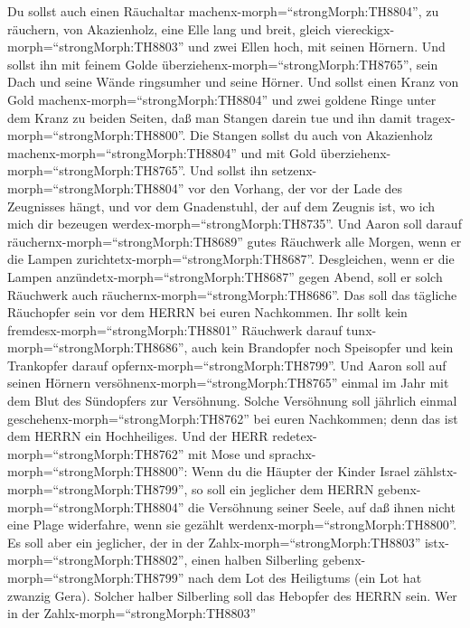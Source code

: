 Du sollst auch einen Räuchaltar
machenx-morph=``strongMorph:TH8804'', zu räuchern, von Akazienholz,
 eine Elle lang und breit, gleich
viereckigx-morph=``strongMorph:TH8803'' und zwei Ellen hoch, mit seinen
Hörnern.  Und sollst ihn mit feinem Golde
überziehenx-morph=``strongMorph:TH8765'', sein Dach und seine Wände
ringsumher und seine Hörner. Und sollst einen Kranz von Gold
machenx-morph=``strongMorph:TH8804''  und zwei goldene Ringe
unter dem Kranz zu beiden Seiten, daß man Stangen darein tue und ihn
damit tragex-morph=``strongMorph:TH8800''.  Die Stangen
sollst du auch von Akazienholz machenx-morph=``strongMorph:TH8804'' und
mit Gold überziehenx-morph=``strongMorph:TH8765''.  Und
sollst ihn setzenx-morph=``strongMorph:TH8804'' vor den Vorhang, der vor
der Lade des Zeugnisses hängt, und vor dem Gnadenstuhl, der auf dem
Zeugnis ist, wo ich mich dir bezeugen
werdex-morph=``strongMorph:TH8735''.  Und Aaron soll darauf
räuchernx-morph=``strongMorph:TH8689'' gutes Räuchwerk alle Morgen, wenn
er die Lampen zurichtetx-morph=``strongMorph:TH8687''. 
Desgleichen, wenn er die Lampen anzündetx-morph=``strongMorph:TH8687''
gegen Abend, soll er solch Räuchwerk auch
räuchernx-morph=``strongMorph:TH8686''. Das soll das tägliche Räuchopfer
sein vor dem HERRN bei euren Nachkommen.  Ihr sollt kein
fremdesx-morph=``strongMorph:TH8801'' Räuchwerk darauf
tunx-morph=``strongMorph:TH8686'', auch kein Brandopfer noch Speisopfer
und kein Trankopfer darauf opfernx-morph=``strongMorph:TH8799''.
 Und Aaron soll auf seinen Hörnern
versöhnenx-morph=``strongMorph:TH8765'' einmal im Jahr mit dem Blut des
Sündopfers zur Versöhnung. Solche Versöhnung soll jährlich einmal
geschehenx-morph=``strongMorph:TH8762'' bei euren Nachkommen; denn das
ist dem HERRN ein Hochheiliges.  Und der HERR
redetex-morph=``strongMorph:TH8762'' mit Mose und
sprachx-morph=``strongMorph:TH8800'':  Wenn du die Häupter
der Kinder Israel zählstx-morph=``strongMorph:TH8799'', so soll ein
jeglicher dem HERRN gebenx-morph=``strongMorph:TH8804'' die Versöhnung
seiner Seele, auf daß ihnen nicht eine Plage widerfahre, wenn sie
gezählt werdenx-morph=``strongMorph:TH8800''.  Es soll aber
ein jeglicher, der in der Zahlx-morph=``strongMorph:TH8803''
istx-morph=``strongMorph:TH8802'', einen halben Silberling
gebenx-morph=``strongMorph:TH8799'' nach dem Lot des Heiligtums (ein Lot
hat zwanzig Gera). Solcher halber Silberling soll das Hebopfer des HERRN
sein.  Wer in der Zahlx-morph=``strongMorph:TH8803''
